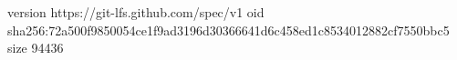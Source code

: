 version https://git-lfs.github.com/spec/v1
oid sha256:72a500f9850054ce1f9ad3196d30366641d6c458ed1c8534012882cf7550bbc5
size 94436
